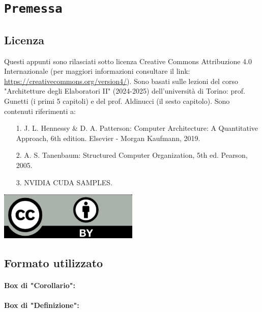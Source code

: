 \chapter*{\centering \texttt{Premessa}}

\section*{Licenza}

Questi appunti sono rilasciati sotto licenza Creative Commons Attribuzione 4.0 Internazionale (per maggiori
informazioni consultare il link: \href{https://creativecommons.org/version4/}{https://creativecommons.org/version4/}).
Sono basati sulle lezioni del corso "Architetture degli Elaboratori II" (2024-2025) dell'università di Torino: prof. Gunetti (i primi 5 capitoli) e del prof. Aldinucci (il sesto capitolo). Sono contenuti riferimenti a: 
\begin{itemize}
  \item [1.] J. L. Hennessy \& D. A. Patterson: Computer Architecture:
A Quantitative Approach, 6th edition. Elsevier - Morgan Kaufmann, 2019. 
\item [2.] A. S. Tanenbaum: Structured Computer Organization, 5th ed.
Pearson, 2005. 
\item [3.] NVIDIA CUDA SAMPLES.
\end{itemize}

\begin{center}
    \includegraphics[width=0.5\textwidth]{images/cc.png}
\end{center}

\section*{Formato utilizzato}

\subsubsection{Box di "Corollario":}


\subsubsection{Box di "Definizione":}

